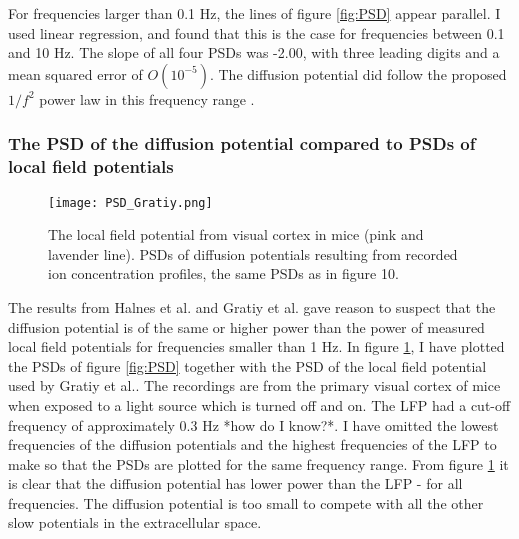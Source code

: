 \documentclass{article}
\begin{document}
For frequencies larger than 0.1 Hz, the lines of figure \ref{fig:PSD} appear parallel. I used linear regression, and found that this is the case for frequencies between 0.1 and 10 Hz. The slope of all four PSDs was -2.00, with three leading digits and a mean squared error of $O(10^{-5})$. The diffusion potential did follow the proposed  $1/f^2$ power law in this frequency range \cite{Halnes2016} .


\subsubsection{The PSD of the diffusion potential compared to PSDs of local field potentials}

\begin{figure}
  \texttt{[image: PSD\_Gratiy.png]}
  \caption{The local field potential from visual cortex in mice (pink and lavender line). PSDs of diffusion potentials resulting from recorded ion concentration profiles, the same PSDs as in figure 10.}
  \label{fig:PSD_Gratiy}
\end{figure}

The results from Halnes et al. and Gratiy et al. gave reason to suspect that the diffusion potential is of the same or higher power than the power of measured local field potentials for frequencies smaller than 1 Hz. In figure \ref{fig:PSD_Gratiy}, I have plotted the PSDs of figure \ref{fig:PSD} together with the PSD of the local field potential used by Gratiy et al.. The recordings are from the primary visual cortex of mice when exposed to a light source which is turned off and on. The LFP had a cut-off frequency of approximately 0.3 Hz *how do I know?*. I have omitted the lowest frequencies of the diffusion potentials and the highest frequencies of the LFP to make so that the PSDs are plotted for the same frequency range. From figure \ref{fig:PSD_Gratiy} it is clear that the diffusion potential has lower power than the LFP  - for all frequencies. The diffusion potential is too small to compete with all the other slow potentials in the extracellular space. 
\end{document}
